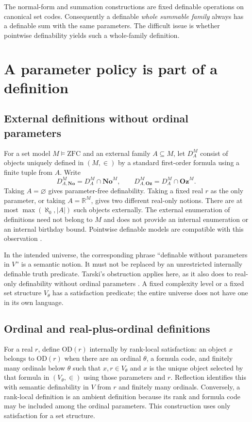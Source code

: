 \documentclass[11pt,a4paper]{article}
\numberwithin{equation}{section}
\theoremstyle{definition}
\theoremstyle{remark}
\newcommand{\No}{\mathbf{No}}
\newcommand{\Oz}{\mathbf{Oz}}
\newcommand{\OD}{\mathrm{OD}}
\newcommand{\R}{\mathbb R}
\begin{document}
The normal-form and summation constructions are fixed definable
operations on canonical set codes. Consequently a definable \emph{whole
summable family} always has a definable sum with the same parameters.
The difficult issue is whether pointwise definability yields such a
whole-family definition.

\section{A parameter policy is part of a definition}
\label{dsn:rp:sec:definitions}

\subsection{External definitions without ordinal parameters}

For a set model $M\models\mathrm{ZFC}$ and an external family $A\subseteq M$,
let $D_A^M$ consist of objects uniquely defined in $(M,\in)$ by a standard
first-order formula using a finite tuple from $A$. Write
\[
 D_{A,\No}^M=D_A^M\cap\No^M,\qquad
 D_{A,\Oz}^M=D_A^M\cap\Oz^M.
\]
Taking $A=\varnothing$ gives parameter-free definability. Taking a fixed
real $r$ as the only parameter, or taking $A=\R^M$, gives two different
real-only notions. There are at most
$\max(\aleph_0,|A|)$ such objects externally. The external enumeration of
definitions need not belong to $M$ and does not provide an internal
enumeration or an internal birthday bound. Pointwise definable models
are compatible with this observation \cite{HLR}.

In the intended universe, the corresponding phrase ``definable without
parameters in $V$'' is a semantic notion. It must not be replaced by an
unrestricted internally definable truth predicate. Tarski's obstruction
applies here, as it also does to real-only definability without ordinal
parameters \cite{DoraisHamkins}. A fixed complexity level or a fixed
set structure $V_\theta$ has a satisfaction predicate; the entire
universe does not have one in its own language.

\subsection{Ordinal and real-plus-ordinal definitions}

For a real $r$, define $\OD(r)$ internally by rank-local satisfaction:
an object $x$ belongs to $\OD(r)$ when there are an ordinal $\theta$, a
formula code, and finitely many ordinals below $\theta$ such that
$x,r\in V_\theta$ and $x$ is the unique object selected by that formula
in $(V_\theta,\in)$ using those parameters and $r$.
Reflection identifies this with semantic definability in $V$ from $r$
and finitely many ordinals. Conversely, a rank-local definition is an
ambient definition because its rank and formula code may be included
among the ordinal parameters. This construction uses only satisfaction
for a set structure.
\end{document}
